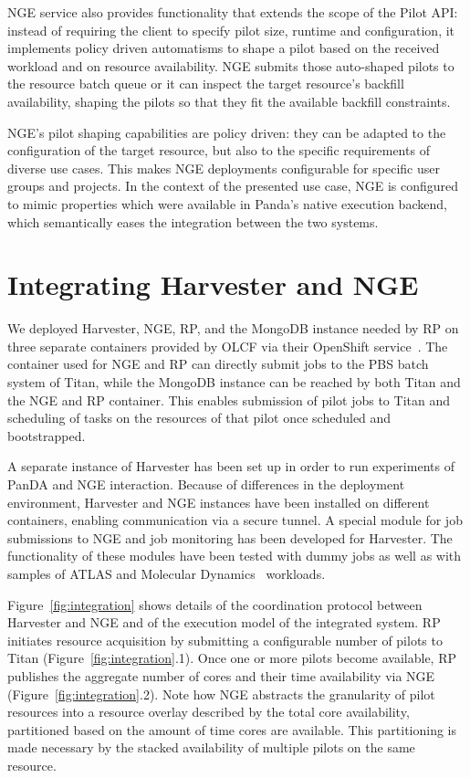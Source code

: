 \documentclass{webofc}
\begin{document}
NGE service also provides functionality that extends the scope of the Pilot
API: instead of requiring the client to specify pilot size, runtime and
configuration, it implements policy driven automatisms to shape a pilot based
on the received workload and on resource availability. NGE submits those
auto-shaped pilots to the resource batch queue or it can inspect the target
resource's backfill availability, shaping the pilots so that they fit the
available backfill constraints.
	
NGE's pilot shaping capabilities are policy driven: they can be adapted to
the configuration of the target resource, but also to the specific 
requirements of diverse use cases. This makes NGE deployments configurable
for specific user groups and projects. In the context of the presented use
case, NGE is configured to mimic properties which were available in Panda's
native execution backend, which semantically eases the integration between
the two systems.


\section{Integrating Harvester and NGE}\label{sec:integration}

We deployed Harvester, NGE, RP, and the MongoDB instance needed by RP on
three separate containers provided by OLCF via their OpenShift
service~\cite{openshift}. The container used for NGE and RP can directly
submit jobs to the PBS batch system of Titan, while the MongoDB instance can
be reached by both Titan and the NGE and RP container. This enables
submission of pilot jobs to Titan and scheduling of tasks on the resources of
that pilot once scheduled and bootstrapped.

A separate instance of Harvester has been set up in order to run experiments
of PanDA and NGE interaction. Because of differences in the deployment
environment, Harvester and NGE instances have been installed on different
containers, enabling communication via a secure tunnel. A special module for
job submissions to NGE and job monitoring has been developed for Harvester.
The functionality of these modules have been tested with dummy jobs as well
as with samples of ATLAS and Molecular Dynamics~\cite{3b6dad414e794d36954333f8f177f47c}
workloads.

Figure~\ref{fig:integration} shows details of the coordination protocol
between Harvester and NGE and of the execution model of the integrated
system. RP initiates resource acquisition by submitting a configurable number
of pilots to Titan (Figure~\ref{fig:integration}.1). Once one or more pilots
become available, RP publishes the aggregate number of cores and their time
availability via NGE (Figure~\ref{fig:integration}.2). Note how NGE abstracts
the granularity of pilot resources into a resource overlay described by the
total core availability, partitioned based on the amount of time cores are
available. This partitioning is made necessary by the stacked availability of
multiple pilots on the same resource.
\end{document}
